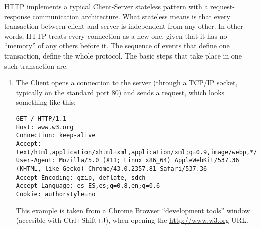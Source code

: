 HTTP implements a typical Client-Server stateless pattern with a request-response communication architecture. What
stateless means is that every transaction between client and server is independent from any other. In other words,
HTTP treats every connection as a new one, given that it has no ``memory'' of any others before it. The sequence of
events that define one transaction, define the whole protocol. The basic steps that take place in one such transaction
are:
\begin{enumerate}
\item The Client opens a connection to the server (through a TCP/IP socket, typically on the standard port 80) and
sends a request, which looks something like this:
\begin{verbatim}
GET / HTTP/1.1
Host: www.w3.org
Connection: keep-alive
Accept: text/html,application/xhtml+xml,application/xml;q=0.9,image/webp,*/*;q=0.8
User-Agent: Mozilla/5.0 (X11; Linux x86_64) AppleWebKit/537.36 (KHTML, like Gecko) Chrome/43.0.2357.81 Safari/537.36
Accept-Encoding: gzip, deflate, sdch
Accept-Language: es-ES,es;q=0.8,en;q=0.6
Cookie: authorstyle=no
\end{verbatim}
This example is taken from a Chrome Browser ``development tools'' window (accesible with Ctrl+Shift+J), when opening
the \url{http://www.w3.org} URL.\\


\end{enumerate}
